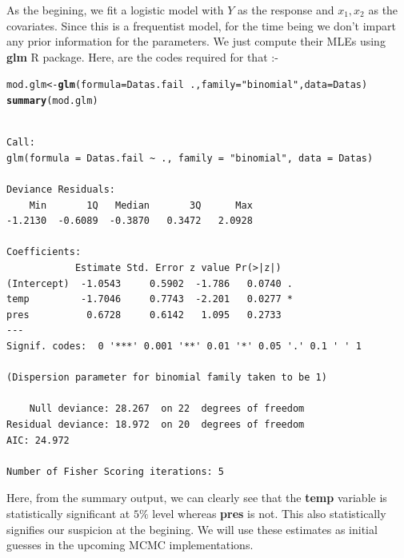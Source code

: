 \documentclass[11pt,english]{article}\usepackage[]{graphicx}\usepackage[]{xcolor}
\makeatletter
\newcommand{\hlstr}[1]{\textcolor[rgb]{0.192,0.494,0.8}{#1}}%
\newcommand{\hlopt}[1]{\textcolor[rgb]{0,0,0}{#1}}%
\newcommand{\hlstd}[1]{\textcolor[rgb]{0.345,0.345,0.345}{#1}}%
\newcommand{\hlkwb}[1]{\textcolor[rgb]{0.69,0.353,0.396}{#1}}%
\newcommand{\hlkwc}[1]{\textcolor[rgb]{0.333,0.667,0.333}{#1}}%
\newcommand{\hlkwd}[1]{\textcolor[rgb]{0.737,0.353,0.396}{\textbf{#1}}}%
\newenvironment{kframe}{%
 \def\at@end@of@kframe{}%
 \ifinner\ifhmode%
  \def\at@end@of@kframe{\end{minipage}}%
  \begin{minipage}{\columnwidth}%
 \fi\fi%
 \def\FrameCommand##1{\hskip\@totalleftmargin \hskip-\fboxsep
 \colorbox{shadecolor}{##1}\hskip-\fboxsep
     \hskip-\linewidth \hskip-\@totalleftmargin \hskip\columnwidth}%
 \MakeFramed {\advance\hsize-\width
   \@totalleftmargin\z@ \linewidth\hsize
   \@setminipage}}%
 {\par\unskip\endMakeFramed%
 \at@end@of@kframe}
\newenvironment{knitrout}{}{} %
\makeatother
\begin{document}
As the begining, we fit a logistic model with $Y$ as the response
and $x_{1},x_{2}$ as the covariates. Since this is a frequentist
model, for the time being we don't impart any prior information for
the parameters. We just compute their MLEs using \textbf{glm} R package.
Here, are the codes required for that :-
\begin{center}
\begin{knitrout}
\color{fgcolor}\begin{kframe}
\begin{alltt}
\hlstd{mod.glm} \hlkwb{<-} \hlkwd{glm}\hlstd{(}\hlkwc{formula} \hlstd{= Datas.fail} \hlopt{~} \hlstd{.,}\hlkwc{family} \hlstd{=} \hlstr{"binomial"}\hlstd{,}\hlkwc{data} \hlstd{= Datas)}
\hlkwd{summary}\hlstd{(mod.glm)}
\end{alltt}
\begin{verbatim}

Call:
glm(formula = Datas.fail ~ ., family = "binomial", data = Datas)

Deviance Residuals: 
    Min       1Q   Median       3Q      Max  
-1.2130  -0.6089  -0.3870   0.3472   2.0928  

Coefficients:
            Estimate Std. Error z value Pr(>|z|)  
(Intercept)  -1.0543     0.5902  -1.786   0.0740 .
temp         -1.7046     0.7743  -2.201   0.0277 *
pres          0.6728     0.6142   1.095   0.2733  
---
Signif. codes:  0 '***' 0.001 '**' 0.01 '*' 0.05 '.' 0.1 ' ' 1

(Dispersion parameter for binomial family taken to be 1)

    Null deviance: 28.267  on 22  degrees of freedom
Residual deviance: 18.972  on 20  degrees of freedom
AIC: 24.972

Number of Fisher Scoring iterations: 5
\end{verbatim}
\end{kframe}
\end{knitrout}
\par\end{center}

Here, from the summary output, we can clearly see that the \textbf{temp
}variable is statistically significant at $5\%$ level whereas \textbf{pres
}is not. This also statistically signifies our suspicion at the begining.
We will use these estimates as initial guesses in the upcoming MCMC
implementations.
\end{document}
